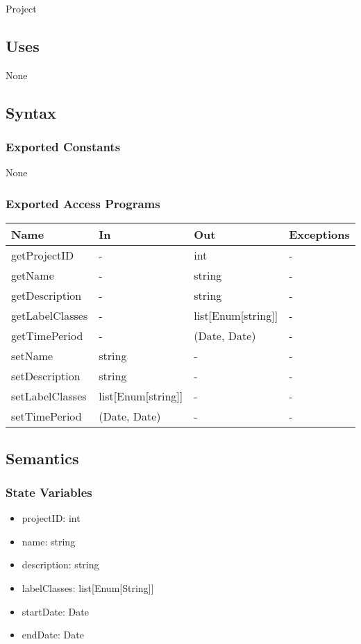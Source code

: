 \documentclass[12pt, titlepage]{article}
\begin{document}
Project

\subsection{Uses}
None

\subsection{Syntax}

\subsubsection{Exported Constants}
None
\subsubsection{Exported Access Programs}

\begin{center}
\begin{tabular}{p{3.2cm} p{4cm} p{4cm} p{2cm}}
\hline
\textbf{Name} & \textbf{In} & \textbf{Out} & \textbf{Exceptions} \\
\hline
getProjectID & - & int & - \\
getName & - & string & - \\
getDescription & - & string & - \\
getLabelClasses & - & list[Enum[string]] & - \\
getTimePeriod & - & (Date, Date) & - \\
setName & string & - & - \\
setDescription & string & - & - \\
setLabelClasses & list[Enum[string]] & - & - \\
setTimePeriod & (Date, Date) & - & - \\
\hline
\end{tabular}
\end{center}

\subsection{Semantics}

\subsubsection{State Variables}
\begin{itemize}
    \item projectID: int
    \item name: string
    \item description: string
    \item labelClasses: list[Enum[String]]
    \item startDate: Date
    \item endDate: Date
\end{itemize}
\end{document}
